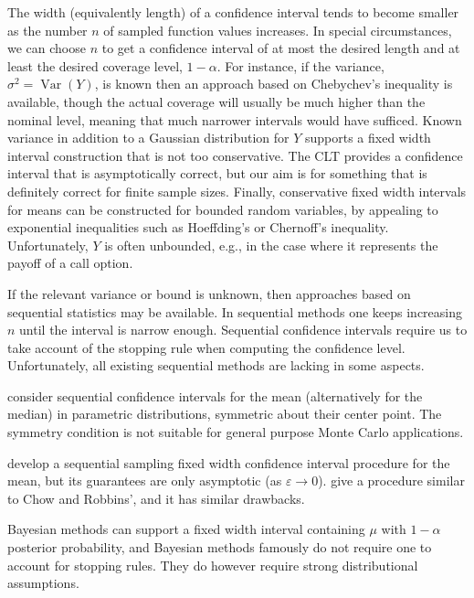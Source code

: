 \documentclass[graybox]{svmult}
\DeclareMathOperator{\var}{Var}
\begin{document}
The width (equivalently length) of a confidence interval
tends to become smaller as the number $n$ of sampled
function values increases. In special circumstances, we can choose $n$ to get
a confidence interval of at most the desired length and at
least the desired coverage level, $1-\alpha$. For instance, if the variance, $\sigma^2=\var(Y)$, is known then an approach based on Chebychev's
inequality is available, though the actual coverage
will usually be much higher than the nominal level,
meaning that much narrower intervals would have sufficed.
Known variance in addition to a Gaussian distribution for $Y$
supports a fixed width interval construction that
is not too conservative. The CLT provides a confidence interval that is asymptotically correct, but our aim is for something that is definitely correct for finite sample sizes.
Finally, conservative fixed width intervals
for means can be constructed for bounded random variables, by appealing
to exponential inequalities such as Hoeffding's or Chernoff's inequality.  Unfortunately, $Y$ is often unbounded, e.g., in the case where it represents the payoff of a call option.

If the relevant variance or bound is unknown, then approaches
based on sequential statistics \citep{Sie85a}
may be available.  In sequential methods one keeps increasing
$n$ until the interval is narrow enough. Sequential
confidence intervals require us to take account of the
stopping rule when computing the confidence level. Unfortunately, all existing sequential methods are lacking in some aspects. 

\cite{SerfWack1976} consider sequential confidence intervals for the mean (alternatively for the median) in parametric distributions, symmetric about their center point.  The symmetry condition is not suitable for general
purpose Monte Carlo applications.

\cite{ChoRob65a} develop a sequential sampling fixed width confidence interval procedure for the mean, but its guarantees are only asymptotic (as $\varepsilon \to 0$). \cite{MukhDatt1996} give a procedure similar to Chow and Robbins', and it has similar drawbacks.

Bayesian methods can support a fixed width
interval containing $\mu$ with $1-\alpha$ posterior probability, and
Bayesian methods famously do not require one to account
for stopping rules. They do however require strong distributional assumptions.
\end{document}
